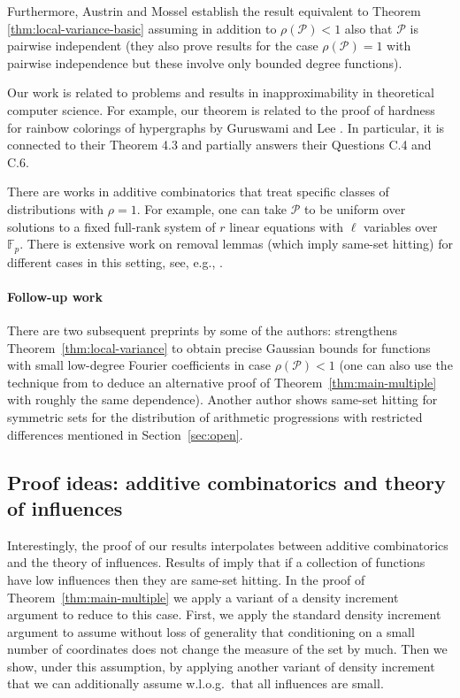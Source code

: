 \documentclass{daj}
\newcommand{\1}{\mathbbm{1}}
\theoremstyle{plain}
\theoremstyle{definition}
\newcommand{\cP}{\mathcal{P}}
\begin{document}
Furthermore, Austrin and Mossel \cite{AM13} establish the result equivalent to 
Theorem \ref{thm:local-variance-basic} assuming in addition to $\rho(\cP) < 1$
also that $\cP$ is pairwise independent (they also prove results for the case
$\rho(\cP)=1$ with pairwise independence but these involve only bounded degree 
functions).

Our work is related to problems and results in inapproximability in theoretical
computer science. 
For example, our theorem is related to the proof of hardness
for rainbow colorings of hypergraphs by Guruswami and Lee
\cite{GL15}. In particular, it is connected to their Theorem 4.3
and partially answers their Questions C.4 and C.6.

There are works in additive combinatorics that treat 
specific classes of distributions with $\rho = 1$. For example, one
can take $\cP$ to be uniform over solutions to a fixed full-rank
system of $r$ linear equations with $\ell$ variables over $\mathbb{F}_p$.
There is extensive work on removal lemmas (which imply same-set hitting)
for different cases in this setting, see, e.g.,
\cite{Gre05a, KSV09, Sha10, FLS18}.

\paragraph{Follow-up work}
There are two subsequent preprints by some of the authors:
\cite{Mos17} strengthens Theorem~\ref{thm:local-variance} to obtain
precise Gaussian bounds for functions with small low-degree
Fourier coefficients in case $\rho(\cP) < 1$ (one can also use the technique
from \cite{Mos17} to deduce an
alternative proof of Theorem~\ref{thm:main-multiple} with roughly
the same dependence).
Another author \cite{SymProg} shows
same-set hitting for symmetric sets for the distribution of
arithmetic progressions with restricted differences mentioned
in Section~\ref{sec:open}.


\subsection{Proof ideas: additive combinatorics and theory of influences}
Interestingly, the proof of our results interpolates between additive
combinatorics and the theory of influences. Results of \cite{Mos10} imply that
if a collection of functions have low influences then they are same-set
hitting. In the proof of Theorem~\ref{thm:main-multiple} we apply a variant of
a density increment argument to reduce to this case. First, we apply the standard
density increment argument to assume without loss of generality that
conditioning on a small number of coordinates does not change the measure of
the set by much. Then we show, under this assumption, by applying another variant
of density increment that we can additionally assume
w.l.o.g.~that all influences are small. 
\end{document}
